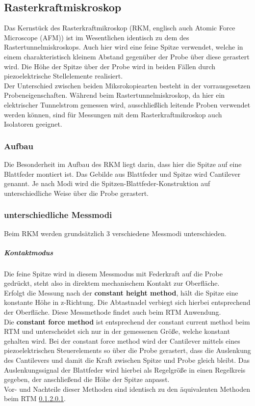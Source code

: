 \documentclass[a4paper,twoside,final]{article}
\begin{document}
\subsubsection{}
\subsection{Rasterkraftmiskroskop}
Das Kernstück des Rasterkraftmikroskop (RKM, englisch auch Atomic Force Microscope (AFM)) ist im Wesentlichen identisch zu dem des Rastertunnelmiskroskops. Auch hier wird eine feine Spitze verwendet, welche in einem charakteristisch kleinem Abstand gegenüber der Probe über diese gerastert wird. Die Höhe der Spitze über der Probe wird in beiden Fällen durch piezoelektrische Stellelemente realisiert. \\
Der Unterschied zwischen beiden Miksrokopiearten besteht in der vorrausgesetzen Probeneigenschaften. Während beim Rastertunnelmiskroskop, da hier ein elektrischer Tunnelstrom gemessen wird, ausschließlich leitende Proben verwendet werden können, sind für Messungen mit dem Rasterkraftmikroskop auch Isolatoren geeignet.

\subsubsection{Aufbau}
Die Besonderheit im Aufbau des RKM liegt darin, dass hier die Spitze auf eine Blattfeder montiert ist. Das Gebilde aus Blattfeder und Spitze wird Cantilever genannt. Je nach Modi wird die Spitzen-Blattfeder-Konstruktion auf unterschiedliche Weise über die Probe gerastert.

\subsubsection{unterschiedliche Messmodi}
Beim RKM werden grundsätzlich 3 verschiedene Messmodi unterschieden.
\subparagraph{Kontaktmodus}
Die feine Spitze wird in diesem Messmodus mit Federkraft auf die Probe gedrückt, steht also in direktem mechanischem Kontakt zur Oberfläche. \\
Erfolgt die Messung nach der \textbf{constant height method}, hält die Spitze eine konstante Höhe in z-Richtung. Die Abtastnadel verbiegt sich hierbei entsprechend der Oberfläche. Diese Messmethode findet auch beim RTM Anwendung. \\
Die \textbf{constant force method} ist entsprechend der constant current method beim RTM und unterscheidet sich nur in der gemessenen Größe, welche konstant gehalten wird. Bei der constant force method wird der Cantilever mittels eines piezoelektrischen Steuerelements so über die Probe gerastert, dass die Auslenkung des Cantilevers und damit die Kraft zwischen Spitze und Probe gleich bleibt. Das Auslenkungssignal der Blattfeder wird hierbei als Regelgröße in einen Regelkreis gegeben, der anschließend die Höhe der Spitze anpasst.\\
Vor- und Nachteile dieser Methoden sind identisch zu den äquivalenten Methoden beim RTM \ref{}.
\end{document}
